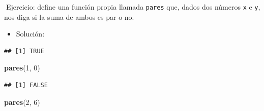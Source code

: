 \documentclass[11pt,]{book}
\newenvironment{Shaded}{\begin{snugshade}}{\end{snugshade}}
\newcommand{\CommentTok}[1]{\textcolor[rgb]{0.37,0.37,0.37}{\textit{#1}}}
\newcommand{\ControlFlowTok}[1]{\textcolor[rgb]{0.27,0.27,0.27}{\textbf{#1}}}
\newcommand{\DecValTok}[1]{\textcolor[rgb]{0.06,0.06,0.06}{#1}}
\newcommand{\KeywordTok}[1]{\textcolor[rgb]{0.27,0.27,0.27}{\textbf{#1}}}
\newcommand{\NormalTok}[1]{#1}
\newcommand{\OperatorTok}[1]{\textcolor[rgb]{0.43,0.43,0.43}{\textbf{#1}}}
\newcommand{\StringTok}[1]{\textcolor[rgb]{0.5,0.5,0.5}{#1}}
\providecommand{\tightlist}{%
  \setlength{\itemsep}{0pt}\setlength{\parskip}{0pt}}
\begin{document}
📝Ejercicio: define una función propia llamada \texttt{pares} que, dados dos números \texttt{x} e \texttt{y}, nos diga si la suma de ambos es par o no.

\begin{itemize}
\tightlist
\item
  Solución:
\end{itemize}

\begin{Shaded}
\end{Shaded}

\begin{verbatim}
## [1] TRUE
\end{verbatim}

\begin{Shaded}
\begin{Highlighting}[]
\KeywordTok{pares}\NormalTok{(}\DecValTok{1}\NormalTok{, }\DecValTok{0}\NormalTok{)}
\end{Highlighting}
\end{Shaded}

\begin{verbatim}
## [1] FALSE
\end{verbatim}

\begin{Shaded}
\begin{Highlighting}[]
\KeywordTok{pares}\NormalTok{(}\DecValTok{2}\NormalTok{, }\DecValTok{6}\NormalTok{)}
\end{Highlighting}
\end{Shaded}
\end{document}
